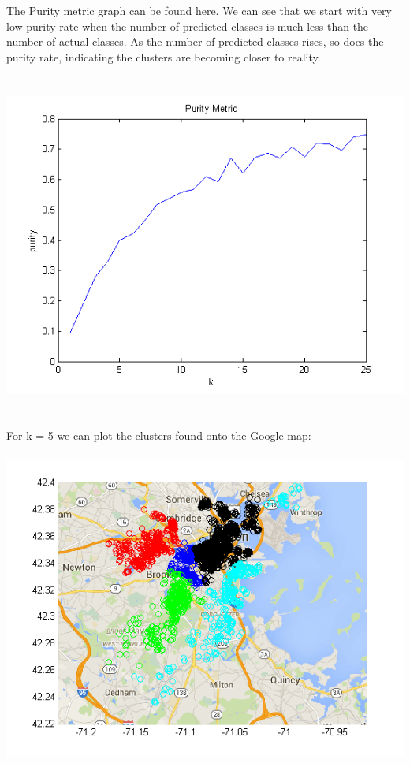 \documentclass[paper=a4, fontsize=11pt]{scrartcl} %
\numberwithin{equation}{section} %
\numberwithin{figure}{section} %
\numberwithin{table}{section} %
\begin{document}
	The Purity metric graph can be found here. We can see that we start with very low purity rate when the number of predicted classes is much less than the number of actual classes. As the number of predicted classes rises, so does the purity rate, indicating the clusters are becoming closer to reality.
	\\\\\\
	\hspace*{-1cm}\includegraphics[]{purity}
	\\\\\\
	For k = 5 we can plot the clusters found onto the Google map:
	\\\\
	\hspace*{-1cm}\includegraphics[]{google_map}
\end{document}
